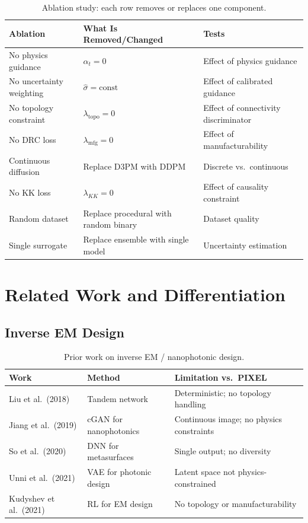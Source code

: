 \documentclass[12pt,a4paper]{article}
\newcommand{\sigmahat}{\hat{\sigma}}
\theoremstyle{definition}
\theoremstyle{plain}
\theoremstyle{remark}
\begin{document}
\begin{table}[H]
\centering
\caption{Ablation study: each row removes or replaces one component.}
\label{tab:ablation}
\begin{tabular}{lll}
\toprule
\textbf{Ablation} & \textbf{What Is Removed/Changed} & \textbf{Tests} \\
\midrule
No physics guidance        & $\alpha_t = 0$                    & Effect of physics guidance \\
No uncertainty weighting   & $\sigmahat = \mathrm{const}$      & Effect of calibrated guidance \\
No topology constraint     & $\lambda_{\mathrm{topo}} = 0$    & Effect of connectivity discriminator \\
No DRC loss                & $\lambda_{\mathrm{mfg}} = 0$     & Effect of manufacturability \\
Continuous diffusion       & Replace D3PM with DDPM            & Discrete vs.\ continuous \\
No KK loss                 & $\lambda_{KK} = 0$               & Effect of causality constraint \\
Random dataset             & Replace procedural with random binary & Dataset quality \\
Single surrogate           & Replace ensemble with single model    & Uncertainty estimation \\
\bottomrule
\end{tabular}
\end{table}

\section{Related Work and Differentiation}
\label{sec:related}

\subsection{Inverse EM Design}

\begin{table}[H]
\centering
\caption{Prior work on inverse EM / nanophotonic design.}
\label{tab:related_em}
\begin{tabular}{llp{5cm}}
\toprule
\textbf{Work} & \textbf{Method} & \textbf{Limitation vs.\ PIXEL} \\
\midrule
Liu et al.\ (2018)       & Tandem network             & Deterministic; no topology handling \\
Jiang et al.\ (2019)     & cGAN for nanophotonics     & Continuous image; no physics constraints \\
So et al.\ (2020)        & DNN for metasurfaces       & Single output; no diversity \\
Unni et al.\ (2021)      & VAE for photonic design    & Latent space not physics-constrained \\
Kudyshev et al.\ (2021)  & RL for EM design           & No topology or manufacturability \\
\bottomrule
\end{tabular}
\end{table}
\end{document}
